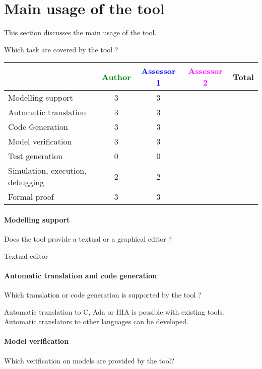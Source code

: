 \section{Main usage of the tool}
\label{main_usage}

This section discusses the main usage of the tool.

Which task are covered by the tool ?


\begin{tabular}{|l | c | c | c | c|}
\hline
& \textcolor{green}{Author} & \textcolor{blue}{Assessor 1} & \textcolor{magenta}{Assessor 2} & Total \\
\hline 
Modelling support & 3 & 3 & &  \\
\hline
Automatic translation  & 3 & 3 & & \\
\hline
Code Generation  & 3 & 3 & & \\
\hline
Model verification & 3 & 3 & & \\
\hline
Test generation & 0 & 0 & & \\
\hline
Simulation, execution, debugging & 2  & 2 & & \\
\hline
Formal proof & 3 & 3 & & \\
\hline
\end{tabular}

\paragraph{Modelling support}
Does the tool provide a  textual or a graphical editor ?

\begin{author_comment}
Textual editor
\end{author_comment}

\paragraph{Automatic translation and code generation}
Which translation or code generation is supported by the tool ?

\begin{author_comment}
Automatic translation to  C, Ada or HIA is possible with existing tools. Automatic translators to other languages can be developed.
\end{author_comment}

\paragraph{Model verification}
Which verification on models are provided by the tool?


